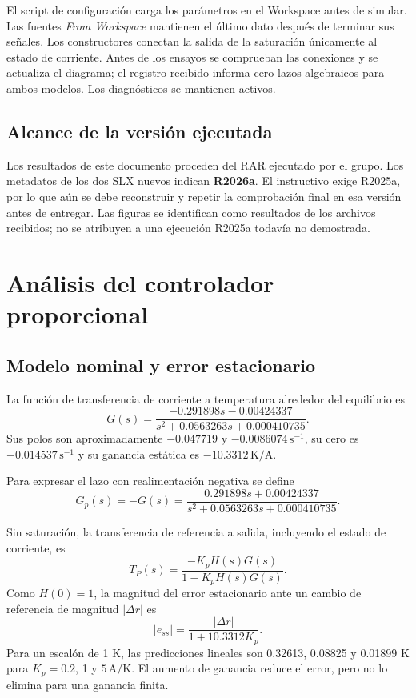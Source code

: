 \documentclass[journal,twocolumn]{IEEEtran}
\begin{document}
El script de configuración carga los parámetros en el Workspace antes de simular. Las fuentes \emph{From Workspace} mantienen el último dato después de terminar sus señales. Los constructores conectan la salida de la saturación únicamente al estado de corriente. Antes de los ensayos se comprueban las conexiones y se actualiza el diagrama; el registro recibido informa cero lazos algebraicos para ambos modelos. Los diagnósticos se mantienen activos.

\subsection{Alcance de la versión ejecutada}
Los resultados de este documento proceden del RAR ejecutado por el grupo. Los metadatos de los dos SLX nuevos indican \textbf{R2026a}. El instructivo exige R2025a, por lo que aún se debe reconstruir y repetir la comprobación final en esa versión antes de entregar. Las figuras se identifican como resultados de los archivos recibidos; no se atribuyen a una ejecución R2025a todavía no demostrada.

\section{Análisis del controlador proporcional}\label{sec:P}
\subsection{Modelo nominal y error estacionario}
La función de transferencia de corriente a temperatura alrededor del equilibrio es
\begin{equation}
G(s)=\frac{-0.291898s-0.00424337}{s^2+0.0563263s+0.000410735}.\label{eq:G}
\end{equation}
Sus polos son aproximadamente $-0.047719$ y $-0.0086074\,\mathrm{s^{-1}}$, su cero es $-0.014537\,\mathrm{s^{-1}}$ y su ganancia estática es $-10.3312\,\mathrm{K/A}$.


Para expresar el lazo con realimentación negativa se define
\begin{equation}
G_p(s)=-G(s)=\frac{0.291898s+0.00424337}{s^2+0.0563263s+0.000410735}.\label{eq:Gp}
\end{equation}

Sin saturación, la transferencia de referencia a salida, incluyendo el estado de corriente, es
\begin{equation}
T_P(s)=\frac{-K_pH(s)G(s)}{1-K_pH(s)G(s)}.
\end{equation}
Como $H(0)=1$, la magnitud del error estacionario ante un cambio de referencia de magnitud $|\Delta r|$ es
\begin{equation}
 |e_{ss}|=\frac{|\Delta r|}{1+10.3312K_p}.\label{eq:ess}
\end{equation}
Para un escalón de 1 K, las predicciones lineales son 0.32613, 0.08825 y 0.01899 K para $K_p=0.2$, 1 y $5\,\mathrm{A/K}$. El aumento de ganancia reduce el error, pero no lo elimina para una ganancia finita.
\end{document}

